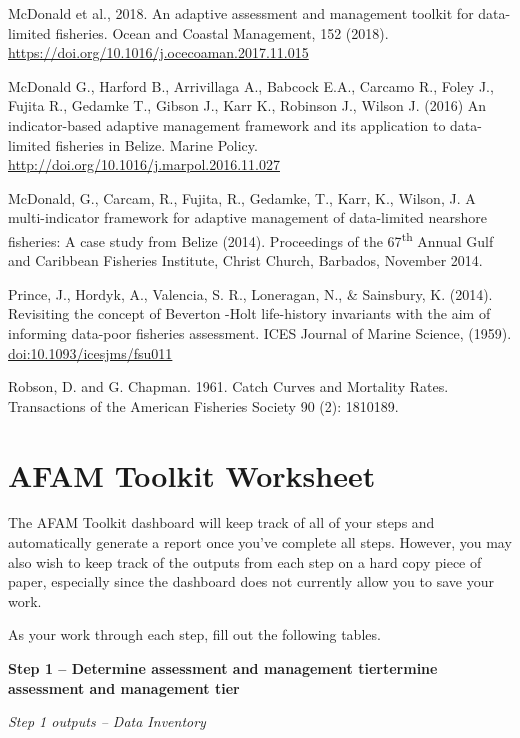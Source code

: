 \documentclass[]{book}
\begin{document}
McDonald et al., 2018. An adaptive assessment and management toolkit for
data-limited fisheries. Ocean and Coastal Management, 152 (2018).
\url{https://doi.org/10.1016/j.ocecoaman.2017.11.015}

McDonald G., Harford B., Arrivillaga A., Babcock E.A., Carcamo R., Foley
J., Fujita R., Gedamke T., Gibson J., Karr K., Robinson J., Wilson J.
(2016) An indicator-based adaptive management framework and its
application to data-limited fisheries in Belize. Marine Policy.
\url{http://doi.org/10.1016/j.marpol.2016.11.027}

McDonald, G., Carcam, R., Fujita, R., Gedamke, T., Karr, K., Wilson, J.
A multi-indicator framework for adaptive management of data-limited
nearshore fisheries: A case study from Belize (2014). Proceedings of the
67\textsuperscript{th} Annual Gulf and Caribbean Fisheries Institute,
Christ Church, Barbados, November 2014.

Prince, J., Hordyk, A., Valencia, S. R., Loneragan, N., \& Sainsbury, K.
(2014). Revisiting the concept of Beverton -Holt life-history invariants
with the aim of informing data-poor fisheries assessment. ICES Journal
of Marine Science, (1959). \url{doi:10.1093/icesjms/fsu011}

Robson, D. and G. Chapman. 1961. Catch Curves and Mortality Rates.
Transactions of the American Fisheries Society 90 (2): 1810189.

\chapter{AFAM Toolkit Worksheet}\label{afam-toolkit-worksheet}

The AFAM Toolkit dashboard will keep track of all of your steps and
automatically generate a report once you've complete all steps. However,
you may also wish to keep track of the outputs from each step on a hard
copy piece of paper, especially since the dashboard does not currently
allow you to save your work.

As your work through each step, fill out the following tables.

\textbf{Step 1 -- Determine assessment and management tiertermine
assessment and management tier}

\emph{Step 1 outputs -- Data Inventory}
\end{document}
